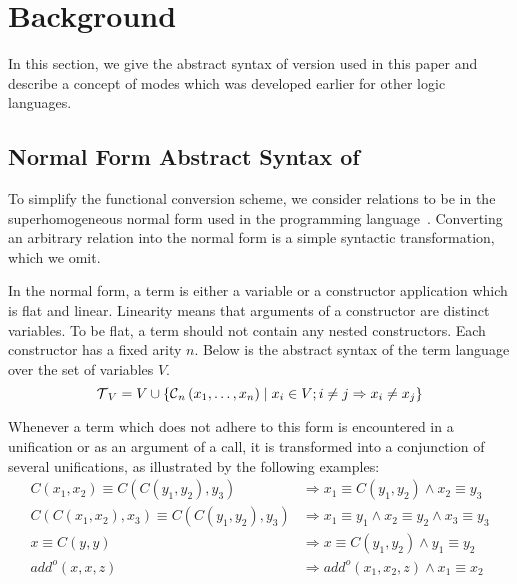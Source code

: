 \section{Background}

In this section, we give the abstract syntax of \micro version used in this paper and describe a concept of modes which was developed earlier for other logic languages.

\subsection{Normal Form Abstract Syntax of \micro}

To simplify the functional conversion scheme, we consider \micro relations to be in the superhomogeneous normal form used in the \merc programming language~\cite{somogyi1996execution}.
Converting an arbitrary \micro relation into the normal form is a simple syntactic transformation, which we omit.

In the normal form, a term is either a variable or a constructor application which is flat and linear.
Linearity means that arguments of a constructor are distinct variables.
To be flat, a term should not contain any nested constructors.
Each constructor has a fixed arity $n$.
Below is the abstract syntax of the term language over the set of variables $V$.
\[  \operatorname{\mathcal{T}}_{V} = V \cup \{\operatorname{\mathcal{C}}_{n}\left( x_1, \ldots, x_{n} \right) \mid x_{i}\in V; i \neq j \Rightarrow x_i \neq x_j\} \]

Whenever a term which does not adhere to this form is encountered in a unification or as an argument of a call, it is transformed into a conjunction of several unifications, as illustrated by the following examples:
\begin{equation}
\begin{split}
C\left( x_1, x_2 \right) \equiv C\left( C\left( y_1, y_2 \right), y_3 \right) & \Rightarrow x_1 \equiv C\left( y_1, y_2 \right) \land x_2 \equiv y_3 \\
C\left( C\left( x_1, x_2 \right), x_3 \right) \equiv C\left( C\left( y_1, y_2 \right), y_3 \right) & \Rightarrow  x_1 \equiv y_1 \land x_2 \equiv y_2 \land x_3 \equiv y_3 \\
x \equiv C \left(y, y \right) & \Rightarrow x \equiv C \left(y_1, y_2\right) \land y_1 \equiv y_2 \\
add^o\left( x, x, z \right) & \Rightarrow add^o\left( x_1, x_2, z \right) \land x_1 \equiv x_2
\end{split}
\end{equation}

